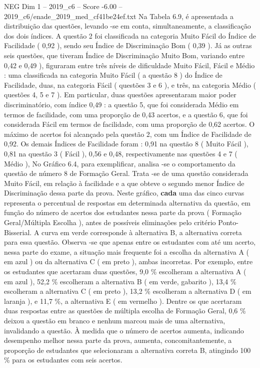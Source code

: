 \begin{textsample}{NEG Dim 1 – 2019\_c6 – Score -6.00 – 2019\_c6/enade\_2019\_med\_cf41be24ef.txt}
Na Tabela 6.9, é apresentada a distribuição das questões, levando -se em conta, simultaneamente, a classificação dos dois índices.
A questão 2 foi classificada na categoria Muito Fácil do Índice de Facilidade ( 0,92 ), sendo seu Índice de Discriminação Bom ( 0,39 ).
Já as outras seis questões, que tiveram Índice de Discriminação Muito Bom, variando entre 0,42 e 0,49 ), figuraram entre três níveis de dificuldade Muito Fácil, Fácil e Médio : uma classificada na categoria Muito Fácil ( a questão 8 ) do Índice de Facilidade, duas, na categoria Fácil ( questões 3 e 6 ), e três, na categoria Médio ( questões 4, 5 e 7 ).
Em particular, duas questões apresentaram maior poder discriminatório, com índice 0,49 : a questão 5, que foi considerada Médio em termos de facilidade, com uma proporção de 0,43 acertos, e a questão 6, que foi considerada Fácil em termos de facilidade, com uma proporção de 0,62 acertos.
O máximo de acertos foi alcançado pela questão 2, com um Índice de Facilidade de 0,92.
Os demais Índices de Facilidade foram : 0,91 na questão 8 ( Muito Fácil ), 0,81 na questão 3 ( Fácil ), 0,56 e 0,48, respectivamente nas questões 4 e 7 ( Médio ), No Gráfico 6.4, para exemplificar, analisa -se o comportamento da questão de número 8 de Formação Geral.
Trata -se de uma questão considerada Muito Fácil, em relação à facilidade e a que obteve o segundo menor Índice de Discriminação dessa parte da prova.
Neste gráfico, \textbf{cada} uma das cinco curvas representa o percentual de respostas em determinada alternativa da questão, em função do número de acertos dos estudantes nessa parte da prova ( Formação Geral/Múltipla Escolha ), antes de possíveis eliminações pelo critério Ponto-Bisserial.
A curva em verde corresponde à alternativa B, a alternativa correta para essa questão.
Observa -se que apenas entre os estudantes com até um acerto, nessa parte do exame, a situação mais frequente foi a escolha da alternativa A ( em azul ) ou da alternativa C ( em preto ), ambas incorretas.
Por exemplo, entre os estudantes que acertaram duas questões, 9,0 \% escolheram a alternativa A ( em azul ), 52,2 \% escolheram a alternativa B ( em verde, gabarito ), 13,4 \% escolheram a alternativa C ( em preto ), 13,2 \% escolheram a alternativa D ( em laranja ), e 11,7 \%, a alternativa E ( em vermelho ).
Dentre os que acertaram duas respostas entre as questões de múltipla escolha de Formação Geral, 0,6 \% deixou a questão em branco e nenhum marcou mais de uma alternativa, invalidando a questão.
À medida que o número de acertos aumenta, indicando desempenho melhor nessa parte da prova, aumenta, concomitantemente, a proporção de estudantes que selecionaram a alternativa correta B, atingindo 100 \% para os estudantes com seis acertos.

\end{textsample}
